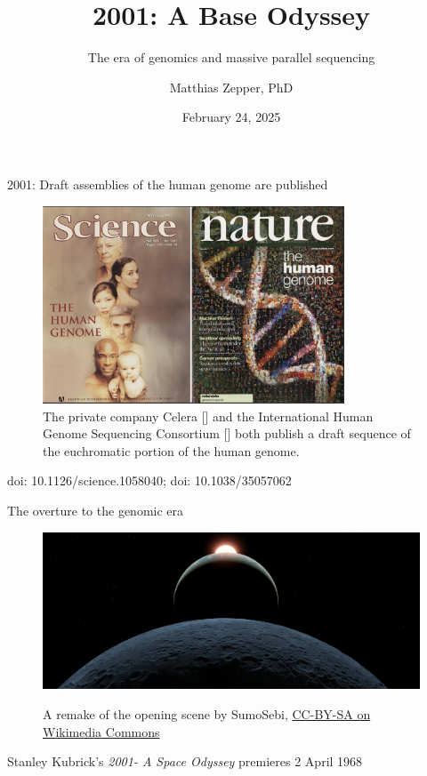 \documentclass[10pt]{beamer}
\title{2001: A Base Odyssey}
\subtitle{The era of genomics and massive parallel sequencing}
\date{February 24, 2025}
\author{Matthias Zepper, PhD}
\institute{NGI Stockholm\par \href{https://ngisweden.scilifelab.se}{https://ngisweden.scilifelab.se}}
\newcommand{\credit}[1]{{\vspace{\fill} \par \raggedleft \scriptsize \mdseries \color{mDarkBrown} #1 \par}}
\newcommand{\creditdarknofill}[1]{{\par \raggedleft \scriptsize \mdseries \color{scMGray} #1 \par}}
\newcommand{\citeme}[1]{{\xspace\color{scAqua} \scriptsize [\cite{#1}]}}
\begin{document}
\maketitle

\begin{frame}{2001: Draft assemblies of the human genome are published}
	\begin{figure}
		\includegraphics[width=0.8\textwidth]{figures/humangenomeproject.png}
		\caption{The private company Celera\citeme{Venter2001} and the International Human Genome Sequencing Consortium\citeme{Lander2001} both publish a draft sequence of the euchromatic portion of the human genome.}
	\end{figure}
	\credit{doi: 10.1126/science.1058040; doi: 10.1038/35057062}
\end{frame}

\begin{frame}[standout]{The overture to the genomic era}
	\begin{figure}
		\includegraphics[width=\textwidth]{./additional_graphics/Opening_2001-_A_Space_Odyssey.png}
		\creditdarknofill{A remake of the opening scene by SumoSebi, \href{https://commons.wikimedia.org/wiki/File:Opening_2001-_A_Space_Odyssey.png}{CC-BY-SA on Wikimedia Commons}}
	\end{figure}
	{\small	Stanley Kubrick's \emph{2001- A Space Odyssey} premieres  2 April 1968}

\end{frame}
\end{document}
